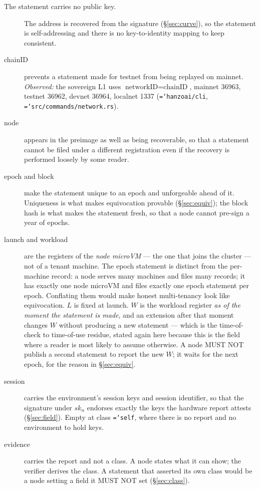 \documentclass[11pt,a4paper]{article}
\newcommand{\code}[1]{\texttt{\hyphenchar\font=`\-\relax #1}}
\begin{document}
\begin{description}
\item[The statement carries no public key.] The address is recovered from the
  signature (\S\ref{sec:curve}), so the statement is self-addressing and there is
  no key-to-identity mapping to keep consistent.
\item[chainID] prevents a statement made for testnet from being replayed on
  mainnet. \emph{Observed:} the sovereign L1 uses $\text{networkID} =
  \text{chainID}$, mainnet 36963, testnet 36962, devnet 36964, localnet 1337
  (\code{hanzoai/cli}, \code{src/commands/network.rs}).
\item[node] appears in the preimage as well as being recoverable, so that a
  statement cannot be filed under a different registration even if the recovery is
  performed loosely by some reader.
\item[epoch and block] make the statement unique to an epoch and unforgeable
  ahead of it. Uniqueness is what makes equivocation provable
  (\S\ref{sec:equiv}); the block hash is what makes the statement fresh, so that a
  node cannot pre-sign a year of epochs.
\item[launch and workload] are the registers of the \emph{node microVM} --- the
  one that joins the cluster --- not of a tenant machine. The epoch statement is
  distinct from the per-machine record: a node serves many machines and files many
  records; it has exactly one node microVM and files exactly one epoch statement
  per epoch. Conflating them would make honest multi-tenancy look like
  equivocation. $L$ is fixed at launch. $W$ is the workload register \emph{as of
  the moment the statement is made}, and an extension after that moment changes
  $W$ without producing a new statement --- which is the time-of-check to
  time-of-use residue, stated again here because this is the field where a reader
  is most likely to assume otherwise. A node MUST NOT publish a second statement to
  report the new $W$; it waits for the next epoch, for the reason in
  \S\ref{sec:equiv}.
\item[session] carries the environment's session keys and session identifier, so
  that the signature under $sk_n$ endorses exactly the keys the hardware report
  attests (\S\ref{sec:field}). Empty at class \code{self}, where there is no
  report and no environment to hold keys.
\item[evidence] carries the report and not a class. A node states what it can
  show; the verifier derives the class. A statement that asserted its own class
  would be a node setting a field it MUST NOT set (\S\ref{sec:class}).
\end{description}
\end{document}
